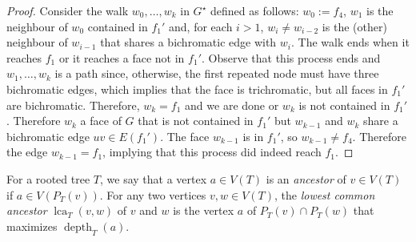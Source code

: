 \documentclass{patmorin}
\DeclareMathOperator{\lca}{lca}
\DeclareMathOperator{\depth}{depth}
\begin{document}
\begin{proof}
  Consider the walk $w_0,\ldots,w_k$ in $G^\star$ defined as follows: $w_0:=f_4$, $w_1$ is the neighbour of $w_0$ contained in $f_1'$ and, for each $i>1$, $w_i\neq w_{i-2}$ is the (other) neighbour of $w_{i-1}$ that shares a bichromatic edge with $w_i$.  The walk ends when it reaches $f_1$ or it reaches a face not in $f_1'$.  Observe that this process ends and $w_1,\ldots,w_k$ is a path since, otherwise, the first repeated node must have three bichromatic edges, which implies that the face is trichromatic, but all faces in $f_1'$ are bichromatic. Therefore, $w_k=f_1$ and we are done or $w_k$ is not contained in $f_1'$.  Therefore $w_k$ a face of $G$ that is not contained in $f_1'$ but $w_{k-1}$ and $w_k$ share a bichromatic edge $uv\in E(f_1')$.  The face $w_{k-1}$ is in $f_1'$, so $w_{k-1}\neq f_4$.  Therefore the edge $w_{k-1}=f_1$, implying that this process did indeed reach $f_1$.
\end{proof}

For a rooted tree $T$, we say that a vertex $a\in V(T)$ is an \emph{ancestor} of $v\in V(T)$ if $a\in V(P_T(v))$.  For any two vertices $v,w\in V(T)$, the \emph{lowest common ancestor} $\lca_T(v,w)$ of $v$ and $w$ is the vertex $a$ of $P_T(v)\cap P_T(w)$ that maximizes $\depth_T(a)$.


%
\end{document}
